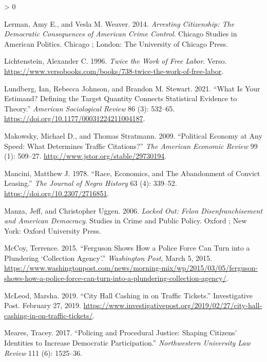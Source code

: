 \documentclass[
  12pt,
]{article}
\newlength{\cslhangindent}
\newenvironment{CSLReferences}[2] %
 {%
  \setlength{\parindent}{0pt}
  \ifodd #1 \everypar{\setlength{\hangindent}{\cslhangindent}}\ignorespaces\fi
  \ifnum #2 > 0
  \setlength{\parskip}{#2\baselineskip}
  \fi
 }%
 {}
\begin{document}
\begin{CSLReferences}{1}{0}
\leavevmode\hypertarget{ref-Lerman2014}{}%
Lerman, Amy E., and Vesla M. Weaver. 2014. \emph{Arresting Citizenship: The Democratic Consequences of {American} Crime Control}. Chicago Studies in {American} Politics. {Chicago ; London}: {The University of Chicago Press}.

\leavevmode\hypertarget{ref-Lichtenstein1996}{}%
Lichtenstein, Alexander C. 1996. \emph{Twice the {Work} of {Free Labor}}. {Verso}. \url{https://www.versobooks.com/books/738-twice-the-work-of-free-labor}.

\leavevmode\hypertarget{ref-Lundberg2021}{}%
Lundberg, Ian, Rebecca Johnson, and Brandon M. Stewart. 2021. {``What {Is Your Estimand}? {Defining} the {Target Quantity Connects Statistical Evidence} to {Theory}.''} \emph{American Sociological Review} 86 (3): 532--65. \url{https://doi.org/10.1177/00031224211004187}.

\leavevmode\hypertarget{ref-Makowsky2009}{}%
Makowsky, Michael D., and Thomas Stratmann. 2009. {``Political {Economy} at {Any Speed}: {What Determines Traffic Citations}?''} \emph{The American Economic Review} 99 (1): 509--27. \url{http://www.jstor.org/stable/29730194}.

\leavevmode\hypertarget{ref-Mancini1978}{}%
Mancini, Matthew J. 1978. {``Race, {Economics}, and {The Abandonment} of {Convict Leasing}.''} \emph{The Journal of Negro History} 63 (4): 339--52. \url{https://doi.org/10.2307/2716851}.

\leavevmode\hypertarget{ref-Manza2006}{}%
Manza, Jeff, and Christopher Uggen. 2006. \emph{Locked Out: Felon Disenfranchisement and {American} Democracy}. Studies in Crime and Public Policy. {Oxford ; New York}: {Oxford University Press}.

\leavevmode\hypertarget{ref-McCoy2015}{}%
McCoy, Terrence. 2015. {``Ferguson Shows How a Police Force Can Turn into a Plundering {`Collection Agency'}.''} \emph{Washington Post}, March 5, 2015. \url{https://www.washingtonpost.com/news/morning-mix/wp/2015/03/05/ferguson-shows-how-a-police-force-can-turn-into-a-plundering-collection-agency/}.

\leavevmode\hypertarget{ref-McLeod2019}{}%
McLeod, Marsha. 2019. {``City {Hall} Cashing in on Traffic Tickets.''} {Investigative Post}. February 27, 2019. \url{https://www.investigativepost.org/2019/02/27/city-hall-cashing-in-on-traffic-tickets/}.

\leavevmode\hypertarget{ref-Meares2017}{}%
Meares, Tracey. 2017. {``Policing and {Procedural Justice}: {Shaping Citizens}' {Identities} to {Increase Democratic Participation}.''} \emph{Northwestern University Law Review} 111 (6): 1525--36.


\end{CSLReferences}
\end{document}
